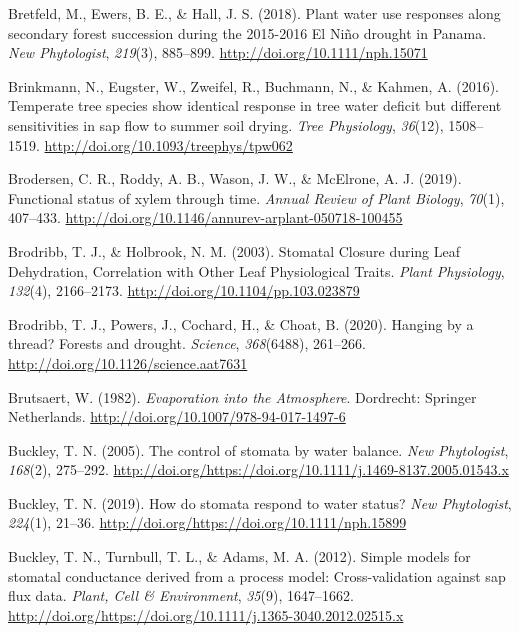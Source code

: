 \documentclass[11pt,twoside]{reedthesis}
\begin{document}
\hypertarget{ref-bretfeld_plant_2018}{}
Bretfeld, M., Ewers, B. E., \& Hall, J. S. (2018). Plant water use
responses along secondary forest succession during the 2015-2016 El Niño
drought in Panama. \emph{New Phytologist}, \emph{219}(3), 885--899.
\url{http://doi.org/10.1111/nph.15071}

\hypertarget{ref-Brinkmann2016}{}
Brinkmann, N., Eugster, W., Zweifel, R., Buchmann, N., \& Kahmen, A.
(2016). Temperate tree species show identical response in tree water
deficit but different sensitivities in sap flow to summer soil drying.
\emph{Tree Physiology}, \emph{36}(12), 1508--1519.
\url{http://doi.org/10.1093/treephys/tpw062}

\hypertarget{ref-Brodersen2019}{}
Brodersen, C. R., Roddy, A. B., Wason, J. W., \& McElrone, A. J. (2019).
Functional status of xylem through time. \emph{Annual Review of Plant
Biology}, \emph{70}(1), 407--433.
\url{http://doi.org/10.1146/annurev-arplant-050718-100455}

\hypertarget{ref-brodribb_stomatal_2003}{}
Brodribb, T. J., \& Holbrook, N. M. (2003). Stomatal Closure during Leaf
Dehydration, Correlation with Other Leaf Physiological Traits.
\emph{Plant Physiology}, \emph{132}(4), 2166--2173.
\url{http://doi.org/10.1104/pp.103.023879}

\hypertarget{ref-Brodribb2020}{}
Brodribb, T. J., Powers, J., Cochard, H., \& Choat, B. (2020). Hanging
by a thread? Forests and drought. \emph{Science}, \emph{368}(6488),
261--266. \url{http://doi.org/10.1126/science.aat7631}

\hypertarget{ref-brutsaert_evaporation_1982}{}
Brutsaert, W. (1982). \emph{Evaporation into the Atmosphere}. Dordrecht:
Springer Netherlands. \url{http://doi.org/10.1007/978-94-017-1497-6}

\hypertarget{ref-Buckley2005}{}
Buckley, T. N. (2005). The control of stomata by water balance.
\emph{New Phytologist}, \emph{168}(2), 275--292.
\url{http://doi.org/https://doi.org/10.1111/j.1469-8137.2005.01543.x}

\hypertarget{ref-Buckley2019}{}
Buckley, T. N. (2019). How do stomata respond to water status? \emph{New
Phytologist}, \emph{224}(1), 21--36.
\url{http://doi.org/https://doi.org/10.1111/nph.15899}

\hypertarget{ref-Buckley2012}{}
Buckley, T. N., Turnbull, T. L., \& Adams, M. A. (2012). Simple models
for stomatal conductance derived from a process model: Cross-validation
against sap flux data. \emph{Plant, Cell \& Environment}, \emph{35}(9),
1647--1662.
\url{http://doi.org/https://doi.org/10.1111/j.1365-3040.2012.02515.x}
\end{document}
